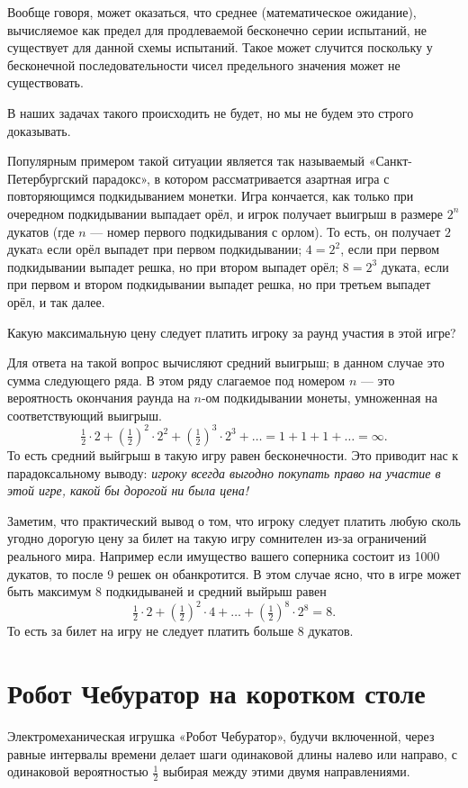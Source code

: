 \documentclass{article}
\begin{document}
Вообще говоря, может оказаться, что среднее (математическое ожидание), вычисляемое как предел для продлеваемой бесконечно серии испытаний, не существует для данной схемы испытаний.
Такое может случится поскольку у бесконечной последовательности чисел предельного значения может не существовать. 

В наших задачах такого происходить не будет,
но мы не будем это строго доказывать.

Популярным примером такой ситуации является так называемый «Санкт-Петербургский парадокс», в котором рассматривается азартная игра с повторяющимся подкидыванием монетки. 
Игра кончается, как только при очередном подкидывании выпадает орёл, и игрок получает выигрыш в размере $2^n$ дукатов 
(где $n$ --- номер первого подкидывания с орлом).
То есть, он получает $2$ дукатa если орёл выпадет при первом подкидывании; 
$4=2^2$, если при первом подкидывании выпадет решка, но при втором выпадет орёл; 
$8=2^3$ дуката, 
если при первом и втором подкидывании выпадет решка, 
но при третьем выпадет орёл, 
и так далее. 

Какую максимальную цену следует платить игроку за раунд участия в этой игре? 

Для ответа на такой вопрос вычисляют средний выигрыш; 
в данном случае это сумма следующего ряда.
В этом ряду слагаемое под номером $n$ 
--- это вероятность окончания раунда на $n$-ом подкидывании монеты, умноженная на соответствующий выигрыш.
\[\tfrac12\cdot2+(\tfrac12)^2\cdot2^2+(\tfrac12)^3\cdot2^3+\dots=1+1+1+\dots=\infty.\]
То есть средний выйгрыш в такую игру равен бесконечности.
Это приводит нас к парадоксальному выводу: 
\emph{игроку всегда выгодно покупать право на участие в этой игре, какой бы дорогой ни была цена!}

Заметим, что практический вывод о том, что игроку следует платить любую сколь угодно дорогую цену за билет на такую игру сомнителен из-за ограничений реального мира.
Например если имущество вашего соперника состоит из 1000 дукатов,
то после 9 решек он обанкротится.
В этом случае ясно, что в игре может быть максимум 8 подкидываней
и средний выйрыш равен 
\[\tfrac12\cdot2+(\tfrac12)^2\cdot4+\dots+(\tfrac12)^8\cdot 2^8=8.\]
То есть за билет на игру не следует платить больше 8 дукатов.


\section{Робот Чебуратор на коротком столе} 

Электромеханическая игрушка «Робот Чебуратор», 
будучи включенной, через равные интервалы времени делает шаги одинаковой длины налево или направо, с одинаковой вероятностью $\tfrac12$ выбирая между этими двумя направлениями. 
\end{document}
